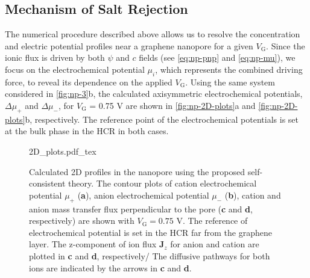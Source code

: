 \subsection{Mechanism of Salt Rejection}
\label{sec:np-mechanism}

The numerical procedure described above allows us to resolve the
concentration and electric potential profiles near a graphene
nanopore for a given $V_{\mathrm{G}}$.
%
Since the ionic flux is driven
by both $\psi$ and $c$ fields (see  \autoref{eq:np-pnp} and \autoref{eq:np-mu}),
we focus on the electrochemical potential $\mu_{i}$, which represents
the combined driving force, to reveal its dependence on the applied
$V_{\mathrm{G}}$.
%
Using the same system considered in 
\autoref{fig:np-3}b, the calculated axisymmetric electrochemical potentials,
$\Delta \mu_{+}$ and $\Delta \mu_{-}$, for
$V_{\mathrm{G}}$ = 0.75 V are shown in \autoref{fig:np-2D-plots}a and
\autoref{fig:np-2D-plots}b, respectively. %
The reference point of the electrochemical
potentials is set at the bulk phase in the HCR in both cases.
%
\begin{figure}[!htbp]
  \centering
  {2D_plots.pdf_tex}
  \caption{Calculated 2D profiles in the nanopore using the proposed
    self-consistent theory. The contour plots of cation
    electrochemical potential $\mu_{\mathrm{+}}$ (\textbf{a}), anion
    electrochemical potential $\mu_{\mathrm{-}}$ (\textbf{b}), cation
    and anion mass transfer flux perpendicular to the pore (\textbf{c}
    and \textbf{d}, respectively) are shown with
    $V_{\mathrm{G}} = 0.75$ V.  The reference of electrochemical
    potential is set in the HCR far from the graphene layer. The
    z-component of ion flux $\symbf{J}_{z}$ for anion and cation are
    plotted in \textbf{c} and \textbf{d}, respectively/%
    The diffusive pathways for both ions are indicated by the arrows
    in \textbf{c} and \textbf{d}.%
  }
  \label{fig:np-2D-plots}
\end{figure}
%
